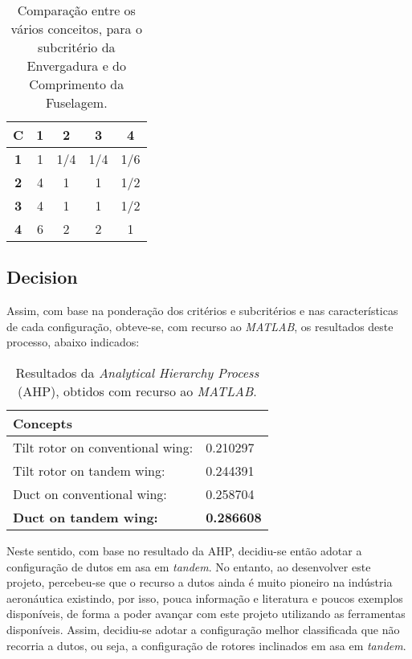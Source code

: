 \begin{table}[H]
\begin{center}
\caption{Comparação entre os vários conceitos, para o subcritério da Envergadura e do Comprimento da Fuselagem.}
\begin{tabular}{ |c|c c c c| }
 \hline
 \textbf{C} & \textbf{1} & \textbf{2} & \textbf{3} & \textbf{4}  \\
\hline
 \textbf{1} & 1 & 1/4 & 1/4 & 1/6 \\
 \textbf{2} & 4 & 1 & 1 & 1/2  \\
 \textbf{3} & 4 & 1 & 1 & 1/2  \\
 \textbf{4} & 6 & 2 & 2 & 1  \\
\hline
\end{tabular}
\end{center}
\end{table}



\subsection{Decision}

Assim, com base na ponderação dos critérios e subcritérios e nas características de cada configuração, obteve-se, com recurso ao \textit{MATLAB}, os resultados deste processo, abaixo indicados:


\begin{table}[H]
\begin{center}
\caption{Resultados da \textit{Analytical Hierarchy Process} (AHP), obtidos com recurso ao \textit{MATLAB}.}
\begin{tabular}{ l l  }
 \textbf{Concepts} &    \\
 \hline
 Tilt rotor on conventional wing: &  0.210297 \\
 Tilt rotor on tandem wing: & 0.244391 \\
 Duct on conventional wing: & 0.258704  \\
 \textbf{Duct on tandem wing:} & \textbf{0.286608}   \\
\end{tabular}
\end{center}
\end{table}


Neste sentido, com base no resultado da AHP, decidiu-se então adotar a configuração de dutos em asa em \textit{tandem}. No entanto, ao desenvolver este projeto, percebeu-se que o recurso a dutos ainda é muito pioneiro na indústria aeronáutica existindo, por isso, pouca informação e literatura e poucos exemplos disponíveis, de forma a poder avançar com este projeto utilizando as ferramentas disponíveis. Assim, decidiu-se adotar a configuração melhor classificada que não recorria a dutos, ou seja, a configuração de rotores inclinados em asa em \textit{tandem}.